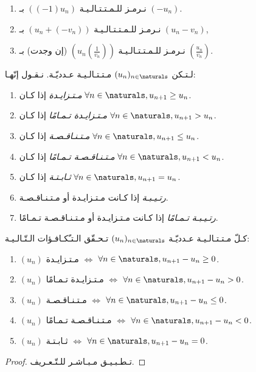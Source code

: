 \begin{remark}
    \begin{enumerate}
        \item نـرمـز للـمـتـتـالـيـة \(\left((-1)u_n\right)\) بـ \((-u_n)\).
        \item نـرمـز للـمـتـتـالـيـة \((u_n + (-v_n))\) بـ \((u_n - v_n)\),
        \item نـرمـز للـمـتـتـالـيـة \(\left(u_n\left(\frac{1}{v_n}\right)\right)\) (إن وجدت)
              بـ \(\left(\frac{u_n}{v_n}\right)\).
    \end{enumerate}
\end{remark}

\begin{definition}%
    \label{def:sequences:monotony-and-variations}
    لـتـكن \((u_n)_{n \in \naturals}\) مـتـتـالـيـة عـدديّـة. نـقـول إنّهـا:
    \begin{enumerate}
        \item \emph{مـتـزايـدة} إذا كـان \(\forall n \in \naturals, u_{n+1} \ge u_n\).
        \item \emph{مـتـزايـدة تـمـامًا} إذا كـان \(\forall n \in \naturals, u_{n+1} > u_n\).
        \item \emph{مـتـنـاقـصـة} إذا كـان \(\forall n \in \naturals, u_{n+1} \le u_n\).
        \item \emph{مـتـنـاقـصـة تـمـامًا} إذا كـان \(\forall n \in \naturals, u_{n+1} < u_n\).
        \item \emph{ثـابـتـة} إذا كـان \(\forall n \in \naturals, u_{n+1} = u_n\).
        \item \emph{رتـيـبـة} إذا كـانت مـتـزايـدة أو مـتـنـاقـصـة.
        \item \emph{رتـيـبـة تـمـامًا} إذا كـانت مـتـزايـدة أو مـتـنـاقـصـة تـمـامًا.
    \end{enumerate}
\end{definition}

\begin{theorem}%
    \label{thm:sequences:variations}
    كـلّ مـتـتـالـيـة عـدديّـة \((u_n)_{n \in \naturals}\) تـحـقّق الـتـّكـافـؤات الـتّـالـيـة:
    \begin{enumerate}
        \item \((u_n)\) مـتـزايـدة  \(\iff\) \(\forall n \in \naturals, u_{n+1} - u_n \ge 0 \).
        \item \((u_n)\) مـتـزايـدة تـمـامًا \(\iff\) \(\forall n \in \naturals, u_{n+1} - u_n > 0 \).
        \item \((u_n)\) مـتـنـاقـصـة \(\iff\) \(\forall n \in \naturals, u_{n+1} - u_n \le 0 \).
        \item \((u_n)\) مـتـنـاقـصـة تـمـامًا \(\iff\) \(\forall n \in \naturals, u_{n+1} - u_n < 0 \).
        \item \((u_n)\) ثـابـتـة \(\iff\) \(\forall n \in \naturals, u_{n+1} - u_n = 0 \).
    \end{enumerate}
\end{theorem}
\begin{proof}%
    تـطـبـيـق مـبـاشـر للـتّـعـريف.
\end{proof}